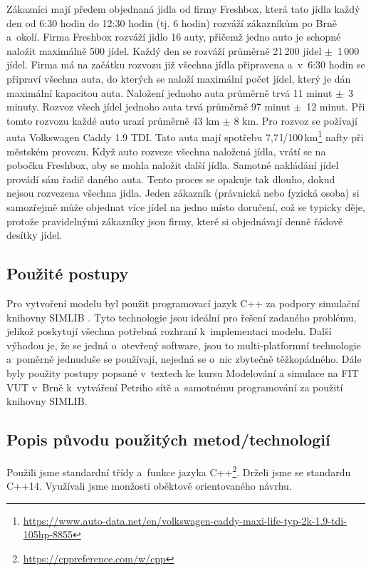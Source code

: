 \documentclass[a4paper, 11pt]{article}
\begin{document}
	Zákazníci mají předem objednaná jidla od firmy Freshbox, která tato jídla
	každý den od 6:30 hodin do 12:30 hodin (tj. 6 hodin) rozváží zákazníkům po
	Brně a~okolí. Firma Freshbox rozváží jidlo 16 auty, přičemž jedno auto
	je schopné naložit maximálně 500 jídel. Každý den se rozváží
	průměrně 21\,200 jídel $\pm$~1\,000 jídel. Firma má na začátku rozvozu
	již všechna jídla připravena a~v~6:30 hodin se připraví všechna auta,
	do kterých se naloží maximální počet jídel, který je dán maximální
	kapacitou auta. Naložení jednoho auta průměrně trvá 11 minut
	$\pm$~3 minuty. Rozvoz všech jídel jednoho auta trvá průměrně 97 minut
	$\pm$~12 minut. Při tomto rozvozu každé auto urazí průměrně 43 km
	$\pm$ 8 km. Pro rozvoz se požívají auta Volkswagen Caddy 1.9 TDI.
	Tato auta mají spotřebu
	7,7\,l/100\,km\footnote{\url{https://www.auto-data.net/en/volkswagen-caddy-maxi-life-typ-2k-1.9-tdi-105hp-8855}}
	nafty při městském provozu. Když auto rozveze všechna
	naložená jídla, vrátí se na pobočku Freshbox, aby se mohla naložit další
	jídla. Samotné nakládání jídel provádí sám řadič daného auta. Tento proces
	se opakuje tak dlouho, dokud nejsou rozvezena všechna jídla. Jeden zákazník
	(právnická nebo fyzická osoba) si samozřejmě může objednat více jídel na
	jedno místo doručení, což se typicky děje, protože pravidelnými zákazníky
	jsou firmy, které si objednávají denně řádově desítky jídel.


	\subsection{Použité postupy}

	Pro vytvoření modelu byl použit programovací jazyk C++ za podpory
	simulační knihovny SIMLIB \cite{SIMLIB}. Tyto technologie jsou ideální pro
	řešení zadaného problému, jelikož poskytují všechna potřebná rozhraní
	k~implementaci modelu. Další výhodou je, že se jedná o~otevřený software,
	jsou to multi-platformní technologie a~poměrně jednuduše se používají,
	nejedná se o~nic zbytečně těžkopádného. Dále byly použity postupy popsané
	v~textech ke kursu Modelování a simulace na FIT VUT v~Brně \cite{IMS_slides}
	k~vytváření Petriho sítě \cite[snímek 123]{IMS_slides} a~samotnému
	programování za použití knihovny SIMLIB.


	\subsection{Popis původu použitých metod/technologií}

	Použili jsme standardní třídy a~funkce jazyka
	C++\footnote{\url{https://cppreference.com/w/cpp}}.
	Drželi jsme se standardu C++14. Využívali jsme monžosti oběktově
	orientovaného návrhu.
\end{document}
